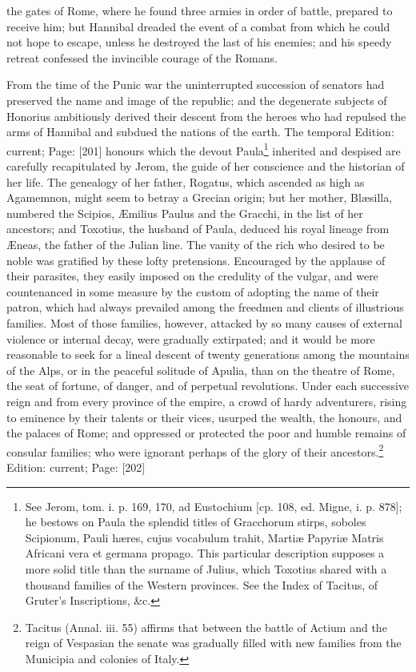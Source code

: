 the gates of Rome, where he found three armies in order of battle, prepared to receive him; but Hannibal dreaded the event of a combat from which he could not hope to escape, unless he destroyed the last of his enemies; and his speedy retreat confessed the invincible courage of the Romans.

From the time of the Punic war the uninterrupted succession of senators had preserved the name and image of the republic; and the degenerate subjects of Honorius ambitiously derived their descent from the heroes who had repulsed the arms of Hannibal and subdued the nations of the earth. The temporal Edition: current; Page: [201] honours which the devout Paula\footnote{See Jerom, tom. i. p. 169, 170, ad Eustochium [cp. 108, ed. Migne, i. p. 878]; he bestows on Paula the splendid titles of Gracchorum stirps, soboles Scipionum, Pauli hæres, cujus vocabulum trahit, Martiæ Papyriæ Matris Africani vera et germana propago. This particular description supposes a more solid title than the surname of Julius, which Toxotius shared with a thousand families of the Western provinces. See the Index of Tacitus, of Gruter\texthebrew{}’s Inscriptions, \&c.} inherited and despised are carefully recapitulated by Jerom, the guide of her conscience and the historian of her life. The genealogy of her father, Rogatus, which ascended as high as Agamemnon, might seem to betray a Grecian origin; but her mother, Blæsilla, numbered the Scipios, Æmilius Paulus and the Gracchi, in the list of her ancestors; and Toxotius, the husband of Paula, deduced his royal lineage from Æneas, the father of the Julian line. The vanity of the rich who desired to be noble was gratified by these lofty pretensions. Encouraged by the applause of their parasites, they easily imposed on the credulity of the vulgar, and were countenanced in some measure by the custom of adopting the name of their patron, which had always prevailed among the freedmen and clients of illustrious families. Most of those families, however, attacked by so many causes of external violence or internal decay, were gradually extirpated; and it would be more reasonable to seek for a lineal descent of twenty generations among the mountains of the Alps, or in the peaceful solitude of Apulia, than on the theatre of Rome, the seat of fortune, of danger, and of perpetual revolutions. Under each successive reign and from every province of the empire, a crowd of hardy adventurers, rising to eminence by their talents or their vices, usurped the wealth, the honours, and the palaces of Rome; and oppressed or protected the poor and humble remains of consular families; who were ignorant perhaps of the glory of their ancestors.\footnote{Tacitus (Annal. iii. 55) affirms that between the battle of Actium and the reign of Vespasian the senate was gradually filled with new families from the Municipia and colonies of Italy.}
Edition: current; Page: [202]

